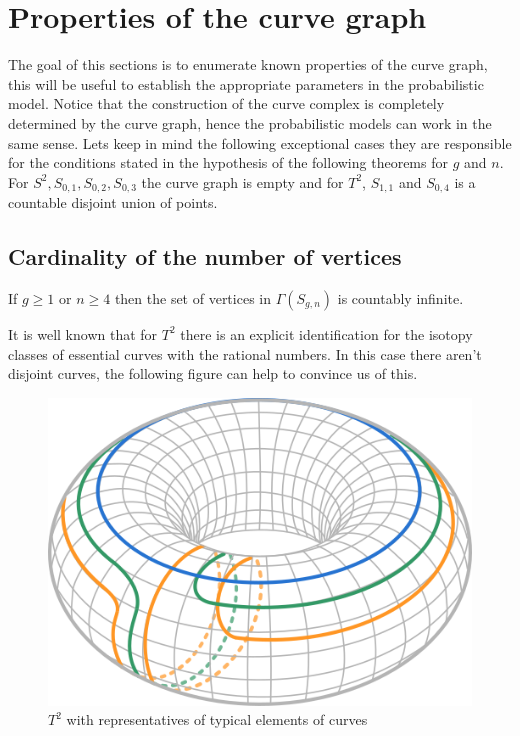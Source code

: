 \section{Properties of the curve graph}
The goal of this sections is to enumerate known properties of the curve graph, this will be useful to establish the appropriate parameters in the probabilistic model. Notice that the construction of the curve complex is completely determined by the curve graph, hence the probabilistic models can work in the same sense. Lets keep in mind the following exceptional cases they are responsible for the conditions stated in the hypothesis of the following theorems for $g$ and $n$. For $ S^2, S_{0,1}, S _{0,2}, S_{0,3} $ the curve graph is empty and for  $ T^{2} $, $ S_{1,1}$ and $ S_{0,4}$ is a countable disjoint union of points.

\subsection{Cardinality of the number of vertices}
\begin{theorem}
If $g\geq 1$ or $n\geq 4$ then the set of vertices in $\Gamma(S_{g,n})$ is countably infinite.
\end{theorem}

It is well known that for $T^{2}$ there is an explicit identification for the isotopy classes of essential curves with the rational numbers. In this case there aren't disjoint curves, the following figure can help to convince us of this.
\vspace{1cm}
\begin{figure}[h!]
	\centering
	\includegraphics[scale=0.5]{Figures/Torus.png}
	\caption{$T^{2}$ with representatives of typical elements of curves}
\end{figure}


